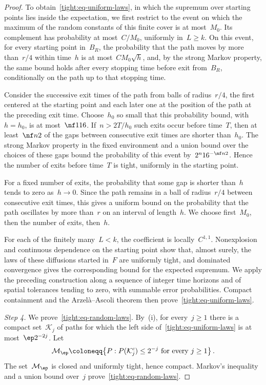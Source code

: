 \documentclass[11pt]{amsart}
\begin{document}
\begin{proof}
\smallskip

To obtain~\eqref{tight:eq-uniform-laws}, in which the supremum over starting points lies inside the expectation, we first restrict to the event on which the maximum of the random constants of this finite cover is at most~$M_0$. Its complement has probability at most~$C/M_0$, uniformly in~$L\geq k$. On this event, for every starting point in~$B_R$, the probability that the path moves by more than~$r/4$ within time~$h$ is at most~$CM_0\sqrt h$, and, by the strong Markov property, the same bound holds after every stopping time before exit from~$B_R$, conditionally on the path up to that stopping time.

\smallskip

Consider the successive exit times of the path from balls of radius~$r/4$, the first centered at the starting point and each later one at the position of the path at the preceding exit time. Choose~$h_0$ so small that this probability bound, with~$h=h_0$, is at most~$\nf1{16}$. If~$n>2T/h_0$ such exits occur before time~$T$, then at least~$\nf n2$ of the gaps between consecutive exit times are shorter than~$h_0$. The strong Markov property in the fixed environment and a union bound over the choices of these gaps bound the probability of this event by~$2^n16^{-\nf n2}$. Hence the number of exits before time~$T$ is tight, uniformly in the starting point.

\smallskip

For a fixed number of exits, the probability that some gap is shorter than~$h$ tends to zero as~$h\to0$. Since the path remains in a ball of radius~$r/4$ between consecutive exit times, this gives a uniform bound on the probability that the path oscillates by more than~$r$ on an interval of length~$h$. We choose first~$M_0$, then the number of exits, then~$h$.

\smallskip

For each of the finitely many~$L<k$, the coefficient is locally~$C^{1,1}$. Nonexplosion and continuous dependence on the starting point show that, almost surely, the laws of these diffusions started in~$F$ are uniformly tight, and dominated convergence gives the corresponding bound for the expected supremum. We apply the preceding construction along a sequence of integer time horizons and of spatial tolerances tending to zero, with summable error probabilities. Compact containment and the Arzel\`a--Ascoli theorem then prove~\eqref{tight:eq-uniform-laws}.

\smallskip

\emph{Step 4.} We prove~\eqref{tight:eq-random-laws}. By~(i), for every~$j\geq1$ there is a compact set~$\mathcal K_j$ of paths for which the left side of~\eqref{tight:eq-uniform-laws} is at most~$\ep2^{-2j}$. Let
\begin{equation*}
	\mathcal M_\ep\coloneqq\bigl\{P:P(\mathcal K_j^c)\leq2^{-j}
	\text{ for every }j\geq1\bigr\}\,.
\end{equation*}
The set~$\mathcal M_\ep$ is closed and uniformly tight, hence compact. Markov's inequality and a union bound over~$j$ prove~\eqref{tight:eq-random-laws}.
\end{proof}
\end{document}
